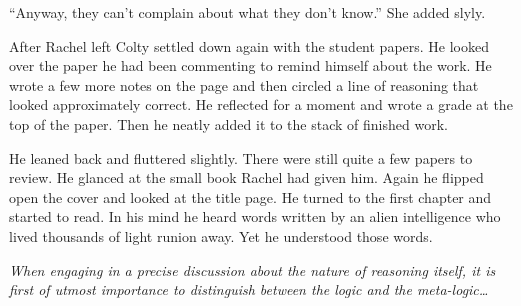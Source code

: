 ``Anyway, they can't complain about what they don't know.'' She added slyly.

After Rachel left Colty settled down again with the student papers. He looked over the paper he
had been commenting to remind himself about the work. He wrote a few more notes on the page and
then circled a line of reasoning that looked approximately correct. He reflected for a moment
and wrote a grade at the top of the paper. Then he neatly added it to the stack of finished
work.

He leaned back and fluttered slightly. There were still quite a few papers to review. He glanced
at the small book Rachel had given him. Again he flipped open the cover and looked at the title
page. He turned to the first chapter and started to read. In his mind he heard words written by
an alien intelligence who lived thousands of light runion away. Yet he understood those words.

\textit{When engaging in a precise discussion about the nature of reasoning itself, it is first
  of utmost importance to distinguish between the logic and the meta-logic\ldots}

